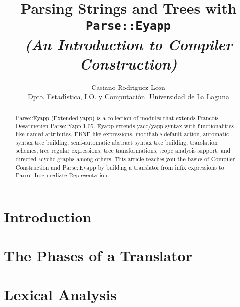 \documentclass[times, 10pt,twocolumn]{article}
\title{Parsing Strings and Trees with {\tt Parse::Eyapp}\\
\it (An Introduction to Compiler Construction)}
\author{
Casiano Rodriguez-Leon\\
Dpto. Estad\'{\i}stica, I.O. y Computaci\'{o}n.
Universidad de La Laguna
}
\begin{document}
\maketitle



%

\begin{abstract}
Parse::Eyapp (Extended yapp) is a collection of modules
that extends Francois Desarmenien Parse::Yapp 1.05.
Eyapp extends yacc/yapp syntax with 
functionalities like named attributes,
EBNF-like expressions, modifiable default action,
automatic syntax tree building,
semi-automatic abstract syntax tree building,
translation schemes, tree regular expressions,
tree transformations, scope analysis support,
and directed acyclic graphs among others.
This article teaches you the basics of 
Compiler Construction and Parse::Eyapp by
building a translator from infix expressions to Parrot 
Intermediate Representation.
\end{abstract}


\section{Introduction}
\label{section:introduction}


\section{The Phases of a Translator}
\label{section:phases}


\section{Lexical Analysis}
\label{section:lexicalanalysis}

\end{document}
